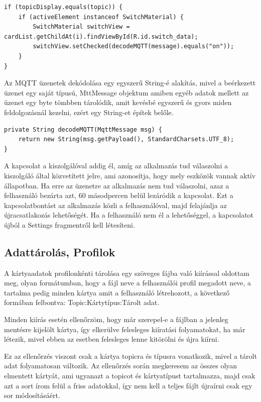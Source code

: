 \documentclass[
]{thesis-ekf}
\theoremstyle{definition}
\theoremstyle{remark}
\begin{document}
\lstset{language=Java}
\begin{lstlisting}[frame=single]
if (topicDisplay.equals(topic)) {
	if (activeElement instanceof SwitchMaterial) {
		SwitchMaterial switchView = cardList.getChildAt(i).findViewById(R.id.switch_data);
		switchView.setChecked(decodeMQTT(message).equals("on"));
	}
}
\end{lstlisting}

Az MQTT üzenetek dekódolása egy egyszerű String-é alakítás, mivel a beérkezett üzenet egy saját típusú, MttMessage
objektum amiben egyéb adatok mellett az üzenet egy byte tömbben tárolódik, amit kevésbé egyszerű és gyors miden
feldolgozásnál kezelni, ezért egy String-et építek belőle.

\lstset{language=Java}
\begin{lstlisting}[frame=single]
private String decodeMQTT(MqttMessage msg) {
	return new String(msg.getPayload(), StandardCharsets.UTF_8);
}

\end{lstlisting}

A kapcsolat a kiszolgálóval addig él, amíg az alkalmazás tud válaszolni a kiszolgáló által közvetített jelre,
ami azonosítja, hogy mely eszközök vannak aktív állapotban. Ha erre az üzenetre az alkalmazás nem tud válaszolni,
azaz a felhasználó bezárta azt, 60 másodpercen belül lezáródik a kapcsolat. Ezt a kapcsolatbontást az alkalmazás
közli a felhasználóval, majd felajánlja az újracsatlakozás lehetőségét. Ha a felhasználó nem él a lehetőséggel,
a kapcsolatot újból a Settings fragmentről kell létesíteni.

\subsection{Adattárolás, Profilok}
A kártyaadatok profilonkénti tárolása egy szöveges fájba való kiírással oldottam meg, olyan formátumban, hogy a fájl
neve a felhasználói profil megadott neve, a tartalma pedig minden kártya amit a felhasználó létrehozott, a következő
formában felbontva: Topic:Kártytípus:Tárolt adat.

Minden kiírás esetén ellenőrzöm, hogy már szerepel-e a fájlban a jelenleg mentésre kijelölt kártya, így elkerülve
felesleges kiíratási folyamatokat, ha már létezik, mivel ebben az esetben felesleges lenne kitörölni és újra kiírni.

Ez az ellenőrzés viszont csak a kártya topicra és típusra vonatkozik, mivel a tárolt adat folyamatosan változik.
Az ellenőrzés során megkeresem az összes olyan elmentett kártyát, ami ugyanazt a topicot és kártyatípust tartalmazza,
majd csak azt a sort írom felül a friss adatokkal, így nem kell a teljes fájlt újraírni csak egy sor módosításáért.
\end{document}
